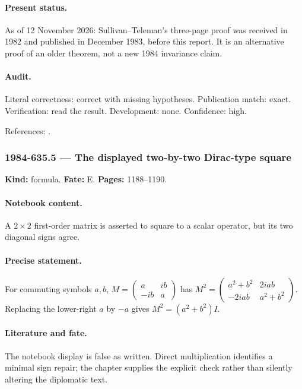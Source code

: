 \paragraph{Present status.} As of 12 November 2026: Sullivan--Teleman's three-page proof was received in 1982 and published in December 1983, before this report. It is an alternative proof of an older theorem, not a new 1984 invariance claim.

\paragraph{Audit.} Literal correctness: correct with missing hypotheses. Publication match: exact. Verification: read the result. Development: none. Confidence: high.

\noindent References: \citep{sullivanteleman1983novikov}.\par

\subsubsection{1984-635.5 --- The displayed two-by-two Dirac-type square}

\label{item:1984-635.5}

\noindent\textbf{Kind:} formula. \textbf{Fate:} E. \textbf{Pages:} 1188--1190.\par

\paragraph{Notebook content.} A \(2\times2\) first-order matrix is asserted to square to a scalar operator, but its two diagonal signs agree.

\paragraph{Precise statement.} For commuting symbols \(a,b\), \(M=\begin{pmatrix}a&ib\\-ib&a\end{pmatrix}\) has \(M^2=\begin{pmatrix}a^2+b^2&2iab\\-2iab&a^2+b^2\end{pmatrix}\). Replacing the lower-right \(a\) by \(-a\) gives \(M^2=(a^2+b^2)I\).

\paragraph{Literature and fate.} The notebook display is false as written. Direct multiplication identifies a minimal sign repair; the chapter supplies the explicit check rather than silently altering the diplomatic text.

